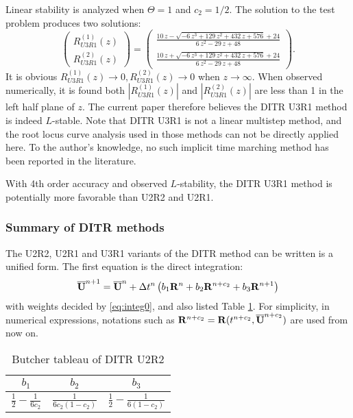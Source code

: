 \documentclass[preprint,12pt]{elsarticle}
\begin{document}
Linear stability is analyzed when $\Theta =1$ and $c_2 = 1/2$.
The solution to the test problem
produces two solutions:
\begin{equation}
    \left(
    \begin{matrix}
        R_{U3R1}^{(1)}(z) \\
        R_{U3R1}^{(2)}(z)
    \end{matrix}
    \right)=\left(\begin{array}{c} \frac{10\,z-\sqrt{-6\,z^3+129\,z^2+432\,z+576}+24}{6\,z^2-29\,z+48}\\ \frac{10\,z+\sqrt{-6\,z^3+129\,z^2+432\,z+576}+24}{6\,z^2-29\,z+48} \end{array}\right)
    .
\end{equation}
It is obvious $R_{U3R1}^{(1)}(z)\rightarrow 0, R_{U3R1}^{(2)}(z)\rightarrow0$ when
$z\rightarrow\infty$.
When observed numerically, it is found both $|R_{U3R1}^{(1)}(z)|$
and $|R_{U3R1}^{(2)}(z)|$ are less than 1 in the left
half plane of $z$.
The current paper therefore believes %
the DITR U3R1 method is indeed $L$-stable.
Note that DITR U3R1 is not a linear multistep method,
and the root locus curve analysis used in those methods
can not be directly applied here. 
To the author's knowledge, no 
such implicit time marching method 
has been reported in the literature.

With 4th order accuracy and observed $L$-stability, the
DITR U3R1 method is potentially more favorable than
U2R2 and U2R1.

\subsubsection{Summary of DITR methods}
\label{sssec:sumDITRs}

The U2R2, U2R1 and U3R1 variants of the
DITR method can be written is a unified form.
The first equation is the direct integration:
\begin{equation}
    \overline{\mathbf{U}}^{n+1} = \overline{\mathbf{U}}^{n} + \mathrm\Delta t^n\left(
    b_1 \mathbf{R}^n +
    b_2 \mathbf{R}^{n+c_2} +
    b_3 \mathbf{R}^{n+1}
    \right)
    \label{eq:DISum}
\end{equation}
with weights decided by \eqref{eq:integ0},
and also listed Table \ref{tab:integ0Tab}.
For simplicity, in numerical expressions,
notations such as $\mathbf{R}^{n+c_2}=\mathbf{R}(t^{n+c_2}, \overline{\mathbf{U}}^{n+c_2})$
are used from now on.
\begin{table}[htbp]
    \centering
    \begin{tabular}{|c|c|c|}
        \hline
        $b_1$                            & $b_2$ & $b_3$ \\
        \hline
        $\frac{1}{2} - \frac{1}{6{c_2}}$ &
        $\frac{1}{6{c_2}(1-{c_2})}$      &
        $\frac{1}{2} - \frac{1}{6(1-{c_2})} $            \\
        \hline
    \end{tabular}
    \caption{Butcher tableau of DITR U2R2}
    \label{tab:integ0Tab}
\end{table}
\end{document}
